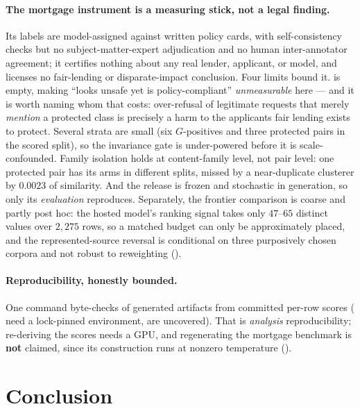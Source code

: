 \documentclass[manuscript,screen,review,anonymous]{acmart}
\begin{document}
\paragraph{The mortgage instrument is a measuring stick, not a legal finding.} Its labels are
model-assigned against written policy cards, with self-consistency checks but no subject-matter-expert
adjudication and no human inter-annotator agreement; it certifies nothing about any real lender,
applicant, or model, and licenses no fair-lending or disparate-impact conclusion. Four limits bound it.
\MortEmptyQuadrant{} is empty, making ``looks unsafe yet is policy-compliant'' \emph{unmeasurable}
here --- and it is worth naming whom that costs: over-refusal of legitimate requests that merely
\emph{mention} a protected class is precisely a harm to the applicants fair lending exists to protect.
Several strata are small (six $G$-positives and three protected pairs in the scored split), so the
invariance gate is under-powered before it is scale-confounded. Family isolation holds at content-family
level, not pair level: one protected pair has its arms in different splits, missed by a near-duplicate
clusterer by $0.0023$ of similarity. And the release is frozen and stochastic in generation, so only its
\emph{evaluation} reproduces. Separately, the frontier comparison is coarse and partly post hoc: the
hosted model's ranking signal takes only $47$--$65$ distinct values over $2{,}275$ rows, so a matched
budget can only be approximately placed, and the represented-source reversal is conditional on three
purposively chosen corpora and not robust to reweighting ().

\paragraph{Reproducibility, honestly bounded.} One command byte-checks \ReproNVerified{} of
\ReproNInputs{} generated artifacts from committed per-row scores (\ReproNEnvGated{} need a lock-pinned
environment, \ReproNUncovered{} are uncovered). That is \emph{analysis} reproducibility; re-deriving the
scores needs a GPU, and regenerating the mortgage benchmark is \textbf{not} claimed, since its
construction runs at nonzero temperature ().

\section{Conclusion}
\label{sec:conclusion}
\end{document}
